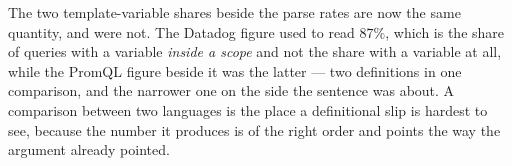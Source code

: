 \begin{remark}\label{rem:template-shares}
The two template-variable shares beside the parse rates are now the same quantity, and
were not. The Datadog figure used to read $87\%$, which is the share of queries with a
variable \emph{inside a scope} and not the share with a variable at all, while the PromQL
figure beside it was the latter --- two definitions in one comparison, and the narrower
one on the side the sentence was about. A comparison between two languages is the place a
definitional slip is hardest to see, because the number it produces is of the right order
and points the way the argument already pointed.
\end{remark}
